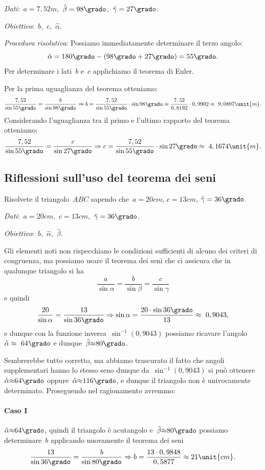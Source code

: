\emph{Dati}:~\(a= 
7,52\unit{m}\),\quad~\(\hat{\beta}=98\grado\),\quad~\({\hat{\gamma}}=27\grado\).

\emph{Obiettivo}:~\(b\),\quad~\(c\),\quad~\(\hat{\alpha}\).

\emph{Procedura risolutiva}:
Possiamo immediatamente determinare il terzo angolo: 
\[{\hat{\alpha}}=180\grado-(98\grado+27\grado)=55\grado.\]
Per determinare i lati~\(b\) e~\(c\) applichiamo il teorema di Euler.

Per la prima uguaglianza del teorema otteniamo:
\[
\frac{7,52}{\sin 55\grado}=\frac{b}{\sin 98\grado} \Rightarrow 
b=\frac{7,52}{\sin 55\grado}\cdot \sin 98\grado\approx
\frac{7,52}{0,8192}\cdot 0,9902\approx~9,0897\unit{m}.
\]
Considerando l'uguaglianza tra il primo e l'ultimo rapporto del teorema 
otteniamo:
\[
\frac{7,52}{\sin 55\grado}=\frac{c}{\sin 27\grado} \Rightarrow 
c=\frac{7,52}{\sin 55\grado}\cdot \sin 27\grado\approx~4,1674\unit{m}.
\]
\subsection{Riflessioni sull'uso del teorema dei seni}
\begin{problema}
Risolvete il triangolo~\(ABC\) sapendo che~\(a= 20\unit{cm}\), \(c= 13\unit{cm}\), 
\({\hat{\gamma}}=36\grado\).
\end{problema}

\emph{Dati}:~\(a= 20\unit{cm}\),\quad~\(c= 
13\unit{cm}\),\quad~\({\hat{\gamma}}=36\grado\).

\emph{Obiettivo}:~\(b\),\quad~\(\hat{\alpha}\),\quad~\(\hat{\beta}\).

Gli elementi noti non rispecchiano le condizioni sufficienti di alcuno dei 
criteri di congruenza, ma possiamo usare il teorema dei seni
che ci assicura che in qualunque triangolo si ha
 \[\frac{a}{\sin \alpha}=\frac{b}{\sin \beta}=\frac{c}{\sin \gamma}\]
e quindi
\[\frac{20}{\sin \alpha}=\frac{13}{\sin 36\grado}\Rightarrow\sin 
\alpha=\frac{20\cdot\sin 36\grado}{13}\approx~0,9043,\]
e dunque con la funzione inversa~\(\sin^{-1}(0,9043)\) possiamo ricavare 
l'angolo~\({\hat{\alpha}}\approx~64\grado\) e 
dunque~\({\hat{\beta}}{\approx}80\grado\).

Sembrerebbe tutto corretto, ma abbiamo trascurato il fatto che angoli 
supplementari hanno lo stesso seno dunque
da~\(\sin ^{-1}(0,9043)\) si può ottenere~\({\hat{\alpha}}{\approx} 64\grado\) 
oppure~\({\hat{\alpha}}{\approx}116\grado\),
e dunque il triangolo non è univocamente determinato. Proseguendo nel 
ragionamento avremmo:
\paragraph{Caso I}
\({\hat{\alpha}}{\approx}64\grado\), quindi il triangolo è acutangolo 
e~\({\hat{\beta}}{\approx} 80\grado\) possiamo determinare~\(b\) applicando 
nuovamente
il teorema dei seni
\[\frac{13}{\sin 36\grado}=\frac{b}{\sin 80\grado}\Rightarrow 
b=\frac{13\cdot0,9848}{0,5877}\approx21\unit{cm}.\]

